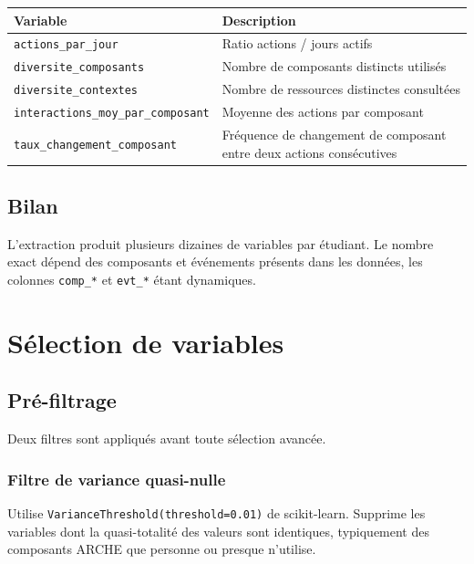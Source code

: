 \documentclass[12pt, a4paper, french]{report}
\begin{document}
\begin{center}
\begin{tabular}{lp{8cm}}
\toprule
\textbf{Variable} & \textbf{Description}\\
\midrule
\texttt{actions\_par\_jour}               & Ratio actions / jours actifs\\
\texttt{diversite\_composants}            & Nombre de composants distincts utilisés\\
\texttt{diversite\_contextes}             & Nombre de ressources distinctes consultées\\
\texttt{interactions\_moy\_par\_composant} & Moyenne des actions par composant\\
\texttt{taux\_changement\_composant}      & Fréquence de changement de composant entre deux actions consécutives\\
\bottomrule
\end{tabular}
\end{center}

\section{Bilan}

L'extraction produit plusieurs dizaines de variables par étudiant. Le nombre exact dépend des composants et événements présents dans les données, les colonnes \texttt{comp\_*} et \texttt{evt\_*} étant dynamiques.

\chapter{Sélection de variables}

\section{Pré-filtrage}

Deux filtres sont appliqués avant toute sélection avancée.

\subsection{Filtre de variance quasi-nulle}

Utilise \texttt{VarianceThreshold(threshold=0.01)} de scikit-learn. Supprime les variables dont la quasi-totalité des valeurs sont identiques, typiquement des composants ARCHE que personne ou presque n'utilise.
\end{document}
